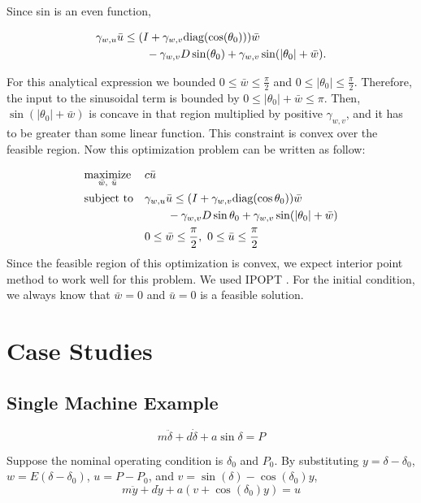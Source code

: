 \documentclass[journal]{IEEEtran}
\theoremstyle{definition}
\begin{document}
Since sin is an even function,

\begin{equation}
\begin{aligned}
\gamma_{w,u}\bar{u}&\leq(I+\gamma_{w,v}\text{diag}(\cos(\theta_0)))\bar{w} \\
& \hskip 2em -\gamma_{w,v}D\sin(\theta_0)+\gamma_{w,v}\sin(|\theta_0|+\bar{w}).
\end{aligned}
\end{equation}

For this analytical expression we bounded $0\leq\bar{w}\leq \frac{\pi}{2}$ and $0\leq|\theta_0|\leq \frac{\pi}{2}$. Therefore, the input to the sinusoidal term is bounded by $0\leq|\theta_0|+\bar{w}\leq\pi$. Then, $\sin(|\theta_0|+\bar{w})$ is concave in that region multiplied by positive $\gamma_{w,v}$, and it has to be greater than some linear function. This constraint is convex over the feasible region. Now this optimization problem can be written as follow:

\begin{equation}
\begin{aligned}
& \underset{\bar{w},\ \bar{u}}{\text{maximize}} & & c\bar{u} \\
& \text{subject to} & & \gamma_{w,u}\bar{u}\leq(I+\gamma_{w,v}\text{diag}(\cos\theta_0))\bar{w} \\
& & & \hskip 2em -\gamma_{w,v}D\sin\theta_0+\gamma_{w,v}\sin(|\theta_0|+\bar{w}) \\
& & & 0\leq\bar{w}\leq \frac{\pi}{2}, \ 0\leq\bar{u}\leq \frac{\pi}{2}
\end{aligned}
\label{eqn_opt2}
\end{equation}
Since the feasible region of this optimization is convex, we expect interior point method to work well for this problem. We used IPOPT \cite{wachter06}. For the initial condition, we always know that $\bar{w}=0$ and $\bar{u}=0$ is a feasible solution.

\section{Case Studies}
\subsection{Single Machine Example}
\begin{equation}
m\ddot{\delta}+d\dot{\delta}+a\sin\delta=P
\end{equation}

Suppose the nominal operating condition is $\delta_0$ and $P_0$. By substituting $y=\delta-\delta_0$, $w=E(\delta-\delta_0)$, $u=P-P_0$, and $v=\sin(\delta)-\cos(\delta_0)y$,
\begin{equation}
m\ddot{y}+d\dot{y}+a(v+\cos(\delta_0)y)=u
\end{equation}
\end{document}
